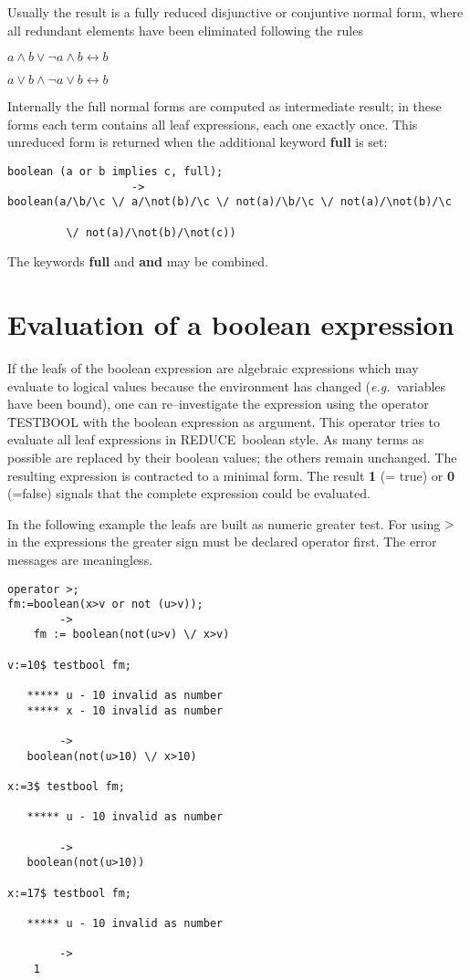\documentclass[11pt,letterpaper]{book}
\makeatletter
\newcommand{\REDUCE}{REDUCE}
\newcommand{\underscore}{\_}
\newcommand{\ttindex}[1]{{\renewcommand{\_}{\protect\underscore}%
                          \index{#1@{\tt #1}}}}
\makeatother
\begin{document}
Usually the result is a fully reduced disjunctive or conjuntive normal
form, where all redundant elements have been eliminated following the
rules

$ a \wedge b \vee \neg a \wedge b \longleftrightarrow b$

$ a \vee b \wedge \neg a \vee b \longleftrightarrow b$

Internally the full normal forms are computed
as intermediate result; in these forms each term contains
all leaf expressions, each one exactly once.  This unreduced form is
returned when the additional keyword {\bf full} is set:
\newpage
{\small\begin{verbatim}
boolean (a or b implies c, full);
                   ->
boolean(a/\b/\c \/ a/\not(b)/\c \/ not(a)/\b/\c \/ not(a)/\not(b)/\c

         \/ not(a)/\not(b)/\not(c))
\end{verbatim}}

The keywords {\bf full} and {\bf and} may be combined.

\section{Evaluation of a boolean expression}

If the leafs of the boolean expression are algebraic expressions which
may evaluate to logical values because the environment has changed
({\em e.g.\ }variables have been bound), one can re--investigate the
expression using the operator \f{TESTBOOL}\ttindex{TESTBOOL} with the
boolean expression as argument.  This operator tries to evaluate all
leaf expressions in \REDUCE\ boolean style.  As many terms as possible
are replaced by their boolean values; the others remain unchanged.
The resulting expression is contracted to a minimal form.  The result
{\bf 1} (= true) or {\bf 0} (=false) signals that the complete
expression could be evaluated.

In the following example the leafs are built as numeric greater test.
For using ${\bf >}$ in the expressions the greater sign must
be declared operator first.  The error messages are meaningless.
{\small\begin{verbatim}
operator >;
fm:=boolean(x>v or not (u>v));
        ->
    fm := boolean(not(u>v) \/ x>v)

v:=10$ testbool fm;

   ***** u - 10 invalid as number
   ***** x - 10 invalid as number

        ->
   boolean(not(u>10) \/ x>10)

x:=3$ testbool fm;

   ***** u - 10 invalid as number

        ->
   boolean(not(u>10))

x:=17$ testbool fm;

   ***** u - 10 invalid as number

        ->
    1
\end{verbatim}}
\end{document}
